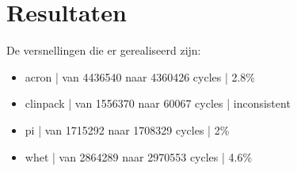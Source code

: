 \documentclass[a4paper,10pt]{article}
\begin{document}
\section{Resultaten}
De versnellingen die er gerealiseerd zijn:
\begin{itemize}
    \item acron | van 4436540 naar 4360426 cycles | 2.8\%
    \item clinpack | van 1556370 naar 60067 cycles | inconsistent
    \item pi | van 1715292 naar 1708329 cycles | 2\%
    \item whet | van 2864289 naar 2970553 cycles | 4.6\%
\end{itemize}
\end{document}
